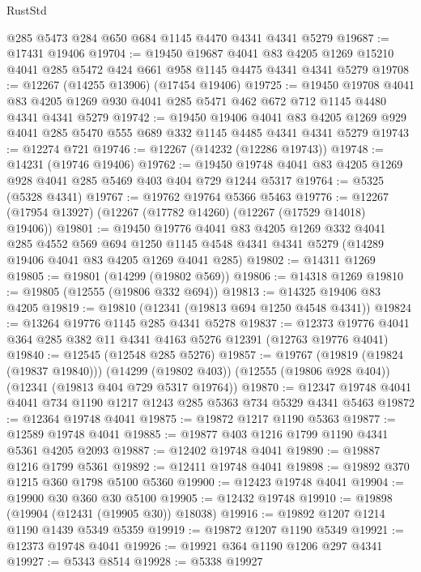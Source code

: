 \begin{lexlean}{RustStd}
\begin{coremodule}
    @285
    @5473
    @284
    @650
    @684
    @1145
    @4470
    @4341
    @4341
    @5279
@19687 := @17431 @19406
@19704 := @19450
    @19687
    @4041
    @83
    @4205
    @1269
    @15210
    @4041
    @285
    @5472
    @424
    @661
    @958
    @1145
    @4475
    @4341
    @4341
    @5279
@19708 := @12267 (@14255 @13906) (@17454 @19406)
@19725 := @19450
    @19708
    @4041
    @83
    @4205
    @1269
    @930
    @4041
    @285
    @5471
    @462
    @672
    @712
    @1145
    @4480
    @4341
    @4341
    @5279
@19742 := @19450
    @19406
    @4041
    @83
    @4205
    @1269
    @929
    @4041
    @285
    @5470
    @555
    @689
    @332
    @1145
    @4485
    @4341
    @4341
    @5279
@19743 := @12274 @721
@19746 := @12267 (@14232 (@12286 @19743))
@19748 := @14231 (@19746 @19406)
@19762 := @19450 @19748 @4041 @83 @4205 @1269 @928 @4041 @285 @5469 @403 @404 @729 @1244 @5317
@19764 := @5325 (@5328 @4341)
@19767 := @19762 @19764 @5366 @5463
@19776 := @12267 (@17954 @13927) (@12267 (@17782 @14260) (@12267 (@17529 @14018) @19406))
@19801 := @19450
    @19776
    @4041
    @83
    @4205
    @1269
    @332
    @4041
    @285
    @4552
    @569
    @694
    @1250
    @1145
    @4548
    @4341
    @4341
    @5279
    (@14289 @19406 @4041 @83 @4205 @1269 @4041 @285)
@19802 := @14311 @1269
@19805 := @19801 (@14299 (@19802 @569))
@19806 := @14318 @1269
@19810 := @19805 (@12555 (@19806 @332 @694))
@19813 := @14325 @19406 @83 @4205
@19819 := @19810 (@12341 (@19813 @694 @1250 @4548 @4341))
@19824 := @13264 @19776 @1145 @285 @4341 @5278
@19837 := @12373 @19776 @4041 @364 @285 @382 @11 @4341 @4163 @5276 @12391 (@12763 @19776 @4041)
@19840 := @12545 (@12548 @285 @5276)
@19857 := @19767
    (@19819 (@19824 (@19837 @19840)))
    (@14299 (@19802 @403))
    (@12555 (@19806 @928 @404))
    (@12341 (@19813 @404 @729 @5317 @19764))
@19870 := @12347 @19748 @4041 @4041 @734 @1190 @1217 @1243 @285 @5363 @734 @5329 @4341 @5463
@19872 := @12364 @19748 @4041
@19875 := @19872 @1217 @1190 @5363
@19877 := @12589 @19748 @4041
@19885 := @19877 @403 @1216 @1799 @1190 @4341 @5361 @4205 @2093
@19887 := @12402 @19748 @4041
@19890 := @19887 @1216 @1799 @5361
@19892 := @12411 @19748 @4041
@19898 := @19892 @370 @1215 @360 @1798 @5100 @5360
@19900 := @12423 @19748 @4041
@19904 := @19900 @30 @360 @30 @5100
@19905 := @12432 @19748
@19910 := @19898 (@19904 (@12431 (@19905 @30)) @18038)
@19916 := @19892 @1207 @1214 @1190 @1439 @5349 @5359
@19919 := @19872 @1207 @1190 @5349
@19921 := @12373 @19748 @4041
@19926 := @19921 @364 @1190 @1206 @297 @4341
@19927 := @5343 @8514
@19928 := @5338 @19927

\end{coremodule}
\end{lexlean}

